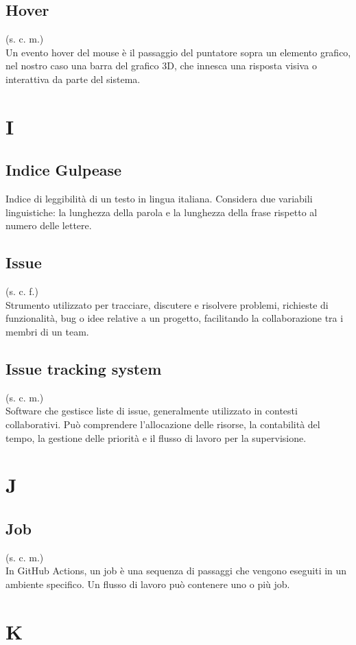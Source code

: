 \subsection{Hover}
(s. c. m.)\\
Un evento hover del mouse è il passaggio del puntatore sopra un elemento grafico, nel nostro caso una barra del grafico 3D, che innesca una risposta visiva o interattiva da parte del sistema.
\pagebreak
\section{I}
\subsection{Indice Gulpease}
Indice di leggibilità di un testo in lingua italiana. Considera due variabili
linguistiche: la lunghezza della parola e la lunghezza della frase rispetto al
numero delle lettere.
\subsection{Issue}
\label{Issue}
(s. c. f.)\\
Strumento utilizzato per tracciare, discutere e risolvere problemi, richieste di funzionalità,
bug o idee relative a un progetto, facilitando la collaborazione tra i membri di un team.
\subsection{Issue tracking system}
(s. c. m.)\\
Software che gestisce liste di issue, generalmente utilizzato in contesti collaborativi.
Può comprendere l'allocazione delle risorse, la contabilità del tempo, la gestione delle
priorità e il flusso di lavoro per la supervisione.
\pagebreak
\section{J}
\subsection{Job}
(s. c. m.)\\
In GitHub Actions, un job è una sequenza di passaggi che vengono eseguiti
in un ambiente specifico. Un flusso di lavoro può contenere uno o più job.
\pagebreak
\section{K}
\pagebreak
